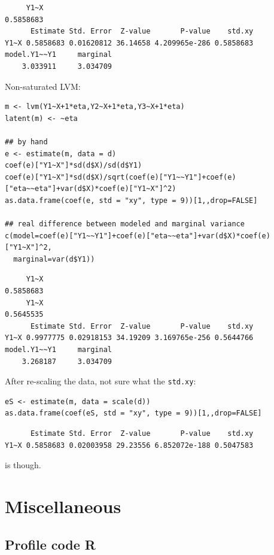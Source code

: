 \documentclass{article}
\begin{document}
\begin{verbatim}
     Y1~X 
0.5858683
      Estimate Std. Error  Z-value       P-value    std.xy
Y1~X 0.5858683 0.01620812 36.14658 4.209965e-286 0.5858683
model.Y1~~Y1     marginal 
    3.033911     3.034709
\end{verbatim}


Non-saturated LVM:
\lstset{language=r,label= ,caption= ,captionpos=b,numbers=none}
\begin{lstlisting}
m <- lvm(Y1~X+1*eta,Y2~X+1*eta,Y3~X+1*eta)
latent(m) <- ~eta

## by hand
e <- estimate(m, data = d)
coef(e)["Y1~X"]*sd(d$X)/sd(d$Y1)
coef(e)["Y1~X"]*sd(d$X)/sqrt(coef(e)["Y1~~Y1"]+coef(e)["eta~~eta"]+var(d$X)*coef(e)["Y1~X"]^2)
as.data.frame(coef(e, std = "xy", type = 9))[1,,drop=FALSE]

## real difference between modeled and marginal variance
c(model=coef(e)["Y1~~Y1"]+coef(e)["eta~~eta"]+var(d$X)*coef(e)["Y1~X"]^2,
  marginal=var(d$Y1))
\end{lstlisting}

\begin{verbatim}
     Y1~X 
0.5858683
     Y1~X 
0.5645535
      Estimate Std. Error  Z-value       P-value    std.xy
Y1~X 0.9977775 0.02918153 34.19209 3.169765e-256 0.5644766
model.Y1~~Y1     marginal 
    3.268187     3.034709
\end{verbatim}


After re-scaling the data, not sure what the \texttt{std.xy}:
\lstset{language=r,label= ,caption= ,captionpos=b,numbers=none}
\begin{lstlisting}
eS <- estimate(m, data = scale(d))
as.data.frame(coef(eS, std = "xy", type = 9))[1,,drop=FALSE]
\end{lstlisting}

\begin{verbatim}
      Estimate Std. Error  Z-value       P-value    std.xy
Y1~X 0.5858683 0.02003958 29.23556 6.852072e-188 0.5047583
\end{verbatim}


is though.

\section{Miscellaneous}
\label{sec:orgc698778}
\subsection{Profile code R}
\label{sec:org18d6aa9}
\end{document}
